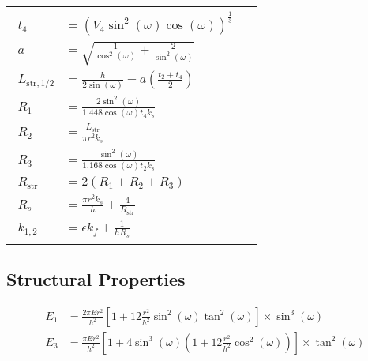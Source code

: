 \begin{table}[ht]
\begin{tabular}{c | c}
{\begin{equation*}
\begin{split}
                t_4 &= (V_4\sin^2(\omega)\cos(\omega))^\frac{1}{3} \\
                a &= \sqrt{\frac{1}{\cos^2(\omega)}+\frac{2}{\sin^2(\omega)}} \\
                L_{\text{str},1/2} &= \frac{h}{2\sin(\omega)} -a\left(\frac{t_2+t_4}{2}\right) \\
                R_1 &= \frac{2\sin^2(\omega)}{1.448\cos(\omega)t_4k_s} \\
                R_2 &= \frac{L_\text{str}}{\pi r^2k_s} \\
                R_3 &= \frac{\sin^2(\omega)}{1.168\cos(\omega)t_2k_s} \\
                R_\text{str} &= 2(R_1 + R_2 + R_3) \\
                R_s &= \frac{\pi r^2k_s}{h} + \frac{4}{R_\text{str}} \\
                k_{1,2} &= \epsilon k_f + \frac{1}{hR_s}
            \end{split}
        \end{equation*} 
        }
    \end{tabular}
\end{table}

\subsection*{Structural Properties}
\begin{equation*}
    \begin{split}
        E_1 &= \frac{2\pi Er^2}{h^2}\left[ 1 + 12\frac{r^2}{h^2}\sin^2(\omega)\tan^2(\omega) \right] \times \sin^3(\omega) \\
        E_3 &= \frac{\pi Er^2}{h^2}\left[ 1 + 4\sin^3(\omega)\left( 1 + 12\frac{r^2}{h^2}\cos^2(\omega)\right) \right] \times \tan^2(\omega)
    \end{split}
\end{equation*}